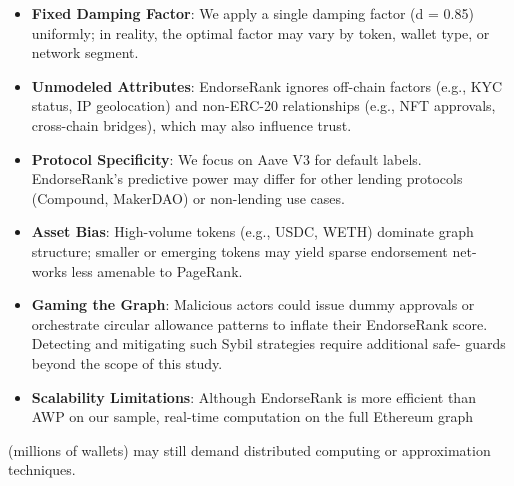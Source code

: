 \begin{itemize}
\item[\textbullet] \textbf{Fixed Damping Factor}: We apply a single damping factor (d = 0.85) uniformly; in reality, the optimal factor may vary by token, wallet type, or network segment.
\item[\textbullet] \textbf{Unmodeled Attributes}: EndorseRank ignores off-chain factors (e.g., KYC status, IP geolocation) and non-ERC-20 relationships (e.g., NFT approvals, cross-chain bridges), which may also influence trust.
\end{itemize}

\begin{itemize}
\item[\textbullet] \textbf{Protocol Specificity}: We focus on Aave V3 for default labels. EndorseRank's predictive power may differ for other lending protocols (Compound, MakerDAO) or non-lending use cases.
\item[\textbullet] \textbf{Asset Bias}: High-volume tokens (e.g., USDC, WETH) dominate graph structure; smaller or emerging tokens may yield sparse endorsement net- works less amenable to PageRank.
\end{itemize}

\begin{itemize}
\item[\textbullet] \textbf{Gaming the Graph}: Malicious actors could issue dummy approvals or orchestrate circular allowance patterns to inflate their EndorseRank score. Detecting and mitigating such Sybil strategies require additional safe- guards beyond the scope of this study.
\end{itemize}

\begin{itemize}
\item[\textbullet] \textbf{Scalability Limitations}: Although EndorseRank is more efficient than AWP on our sample, real-time computation on the full Ethereum graph
\end{itemize}
(millions of wallets) may still demand distributed computing or approximation techniques.
